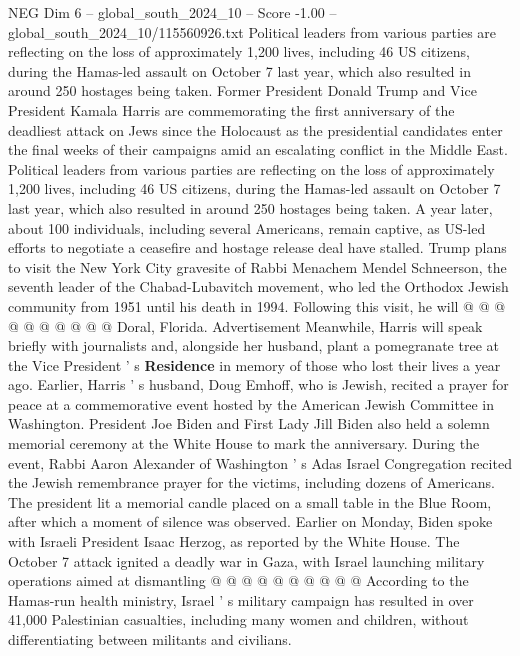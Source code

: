 \begin{textsample}{NEG Dim 6 – global\_south\_2024\_10 – Score -1.00 – global\_south\_2024\_10/115560926.txt}  \label{ex:f6_neg_052}
Political leaders from various parties are reflecting on the loss of approximately 1,200 lives, including 46 US citizens, during the Hamas-led assault on October 7 last year, which also resulted in around 250 hostages being taken.
Former President Donald Trump and Vice President Kamala Harris are commemorating the first anniversary of the deadliest attack on Jews since the Holocaust as the presidential candidates enter the final weeks of their campaigns amid an escalating conflict in the Middle East.
Political leaders from various parties are reflecting on the loss of approximately 1,200 lives, including 46 US citizens, during the Hamas-led assault on October 7 last year, which also resulted in around 250 hostages being taken.
A year later, about 100 individuals, including several Americans, remain captive, as US-led efforts to negotiate a ceasefire and hostage release deal have stalled.
Trump plans to visit the New York City gravesite of Rabbi Menachem Mendel Schneerson, the seventh leader of the Chabad-Lubavitch movement, who led the Orthodox Jewish community from 1951 until his death in 1994.
Following this visit, he will @ @ @ @ @ @ @ @ @ @ Doral, Florida.
Advertisement Meanwhile, Harris will speak briefly with journalists and, alongside her husband, plant a pomegranate tree at the Vice President ' s \textbf{Residence} in memory of those who lost their lives a year ago.
Earlier, Harris ' s husband, Doug Emhoff, who is Jewish, recited a prayer for peace at a commemorative event hosted by the American Jewish Committee in Washington.
President Joe Biden and First Lady Jill Biden also held a solemn memorial ceremony at the White House to mark the anniversary.
During the event, Rabbi Aaron Alexander of Washington ' s Adas Israel Congregation recited the Jewish remembrance prayer for the victims, including dozens of Americans.
The president lit a memorial candle placed on a small table in the Blue Room, after which a moment of silence was observed.
Earlier on Monday, Biden spoke with Israeli President Isaac Herzog, as reported by the White House.
The October 7 attack ignited a deadly war in Gaza, with Israel launching military operations aimed at dismantling @ @ @ @ @ @ @ @ @ @ According to the Hamas-run health ministry, Israel ' s military campaign has resulted in over 41,000 Palestinian casualties, including many women and children, without differentiating between militants and civilians.

\end{textsample}
